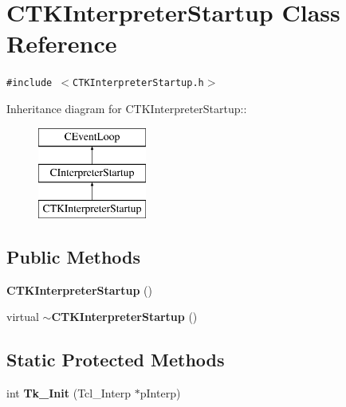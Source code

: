 \section{CTKInterpreter\-Startup  Class Reference}
\label{classCTKInterpreterStartup}
{\tt \#include $<$CTKInterpreter\-Startup.h$>$}

Inheritance diagram for CTKInterpreter\-Startup::\begin{figure}[H]
\begin{center}
\leavevmode
\includegraphics[height=3cm]{classCTKInterpreterStartup}
\end{center}
\end{figure}
\subsection*{Public Methods}
\begin{CompactItemize}
\item 
{\bf CTKInterpreter\-Startup} ()
\item 
virtual {\bf $\sim$CTKInterpreter\-Startup} ()
\end{CompactItemize}
\subsection*{Static Protected Methods}
\begin{CompactItemize}
\item 
int {\bf Tk\_\-Init} (Tcl\_\-Interp $\ast$p\-Interp)
\end{CompactItemize}
